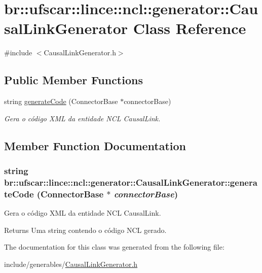\hypertarget{classbr_1_1ufscar_1_1lince_1_1ncl_1_1generator_1_1CausalLinkGenerator}{
\section{br::ufscar::lince::ncl::generator::CausalLinkGenerator Class Reference}
\label{classbr_1_1ufscar_1_1lince_1_1ncl_1_1generator_1_1CausalLinkGenerator}
}


{\ttfamily \#include $<$CausalLinkGenerator.h$>$}

\subsection*{Public Member Functions}
\begin{DoxyCompactItemize}
\item 
string \hyperlink{classbr_1_1ufscar_1_1lince_1_1ncl_1_1generator_1_1CausalLinkGenerator_aece1c5f4275a484a47d1b3e47904d146}{generateCode} (ConnectorBase $\ast$connectorBase)
\begin{DoxyCompactList}\small\item\em Gera o código XML da entidade NCL CausalLink. \item\end{DoxyCompactList}\end{DoxyCompactItemize}


\subsection{Member Function Documentation}
\hypertarget{classbr_1_1ufscar_1_1lince_1_1ncl_1_1generator_1_1CausalLinkGenerator_aece1c5f4275a484a47d1b3e47904d146}{
\subsubsection[{generateCode}]{\setlength{\rightskip}{0pt plus 5cm}string br::ufscar::lince::ncl::generator::CausalLinkGenerator::generateCode (ConnectorBase $\ast$ {\em connectorBase})}}
\label{classbr_1_1ufscar_1_1lince_1_1ncl_1_1generator_1_1CausalLinkGenerator_aece1c5f4275a484a47d1b3e47904d146}


Gera o código XML da entidade NCL CausalLink. 

\begin{DoxyReturn}{Returns}
Uma string contendo o código NCL gerado. 
\end{DoxyReturn}


The documentation for this class was generated from the following file:\begin{DoxyCompactItemize}
\item 
include/generables/\hyperlink{CausalLinkGenerator_8h}{CausalLinkGenerator.h}\end{DoxyCompactItemize}
